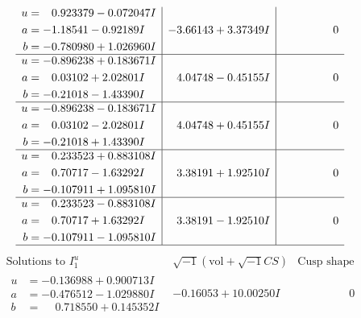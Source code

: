 \documentclass[1p]{elsarticle_modified}
\theoremstyle{definition}
\newcommand{\I}{\sqrt{-1}}
\begin{document}
$$\begin{array}{c|c|c}
\begin{aligned}
u &= \phantom{-}0.923379 - 0.072047 I \\
a &= -1.18541 - 0.92189 I \\
b &= -0.780980 + 1.026960 I\end{aligned}
 & -3.66143 + 3.37349 I & \phantom{-0.000000 } 0 \\ \hline\begin{aligned}
u &= -0.896238 + 0.183671 I \\
a &= \phantom{-}0.03102 + 2.02801 I \\
b &= -0.21018 - 1.43390 I\end{aligned}
 & \phantom{-}4.04748 - 0.45155 I & \phantom{-0.000000 } 0 \\ \hline\begin{aligned}
u &= -0.896238 - 0.183671 I \\
a &= \phantom{-}0.03102 - 2.02801 I \\
b &= -0.21018 + 1.43390 I\end{aligned}
 & \phantom{-}4.04748 + 0.45155 I & \phantom{-0.000000 } 0 \\ \hline\begin{aligned}
u &= \phantom{-}0.233523 + 0.883108 I \\
a &= \phantom{-}0.70717 - 1.63292 I \\
b &= -0.107911 + 1.095810 I\end{aligned}
 & \phantom{-}3.38191 + 1.92510 I & \phantom{-0.000000 } 0 \\ \hline\begin{aligned}
u &= \phantom{-}0.233523 - 0.883108 I \\
a &= \phantom{-}0.70717 + 1.63292 I \\
b &= -0.107911 - 1.095810 I\end{aligned}
 & \phantom{-}3.38191 - 1.92510 I & \phantom{-0.000000 } 0\\
 \hline 
 \end{array}$$\newpage$$\begin{array}{c|c|c}  
\text{Solutions to }I^u_{1}& \I (\text{vol} + \sqrt{-1}CS) & \text{Cusp shape}\\
 \hline 
\begin{aligned}
u &= -0.136988 + 0.900713 I \\
a &= -0.476512 - 1.029880 I \\
b &= \phantom{-}0.718550 + 0.145352 I\end{aligned}
 & -0.16053 + 10.00250 I & \phantom{-0.000000 } 0 \\ \hline\begin{aligned}

\end{aligned}
\end{array}$$
\end{document}
